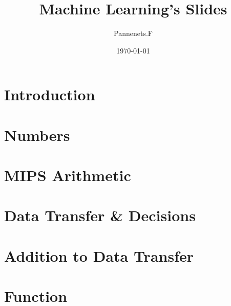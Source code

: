 \documentclass[en,11pt,english,black,simple,device=ppt]{elegantbook}
\title{Machine Learning's Slides}
\author{Pannenets.F}
\date{\today}
\begin{document}
\maketitle
\frontmatter

\mainmatter



\section{Introduction}



\section{Numbers}




\section{MIPS Arithmetic}



\section{Data Transfer \& Decisions}



\section{Addition to Data Transfer}



\section{Function}
\end{document}
